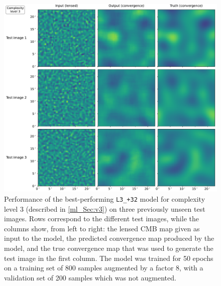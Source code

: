 \begin{figure}[tp]
\includegraphics[width=\textwidth]{v3_3x3}
\caption{Performance of the best-performing \texttt{L3\_+32} model for complexity level 3 (described in \autoref{ml_Sec:v3}) on three previously unseen test images. Rows correspond to the different test images, while the columns show, from left to right: the lensed CMB map given as input to the model, the predicted convergence map produced by the model, and the true convergence map that was used to generate the test image in the first column. The model was trained for 50 epochs on a training set of 800 samples augmented by a factor 8, with a validation set of 200 samples which was not augmented.}
\label{ml_Fig:v3_3x3}
\end{figure}

